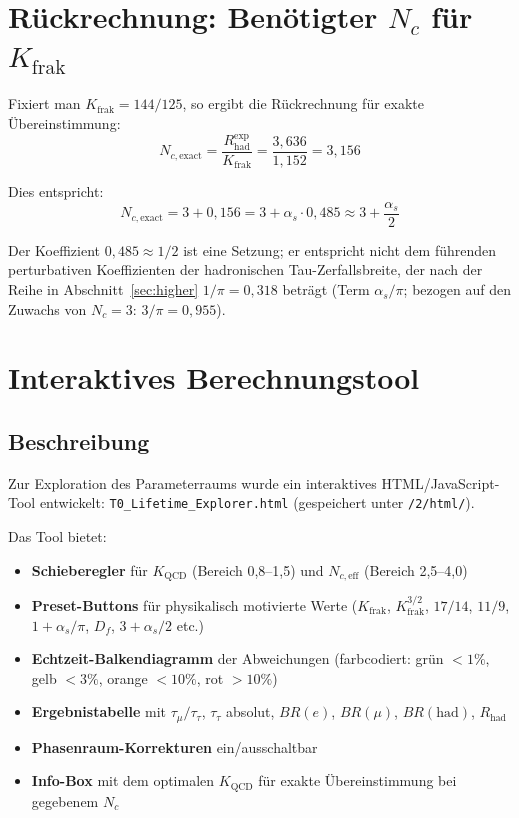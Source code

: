 	
	\section{Rückrechnung: Benötigter $N_c$ für $K_\text{frak}$}
	
	Fixiert man $K_\text{frak} = 144/125$, so ergibt die Rückrechnung für exakte Übereinstimmung:
	\begin{equation}
		N_{c,\text{exact}} = \frac{R_\text{had}^\text{exp}}{K_\text{frak}} = \frac{3{,}636}{1{,}152} = 3{,}156
	\end{equation}
	
	Dies entspricht:
	\begin{equation}
		N_{c,\text{exact}} = 3 + 0{,}156 = 3 + \alpha_s \cdot 0{,}485 \approx 3 + \frac{\alpha_s}{2}
	\end{equation}
	
	Der Koeffizient $0{,}485 \approx 1/2$ ist eine Setzung; er entspricht nicht dem führenden perturbativen Koeffizienten der hadronischen Tau-Zerfallsbreite, der nach der Reihe in Abschnitt~\ref{sec:higher} $1/\pi = 0{,}318$ beträgt (Term $\alpha_s/\pi$; bezogen auf den Zuwachs von $N_c = 3$: $3/\pi = 0{,}955$).
	
	
	\section{Interaktives Berechnungstool}
	
	\subsection{Beschreibung}
	
	Zur Exploration des Parameterraums wurde ein interaktives HTML/JavaScript-Tool entwickelt: \texttt{T0\_Lifetime\_Explorer.html} (gespeichert unter \texttt{/2/html/}).
	
	Das Tool bietet:
	\begin{itemize}
		\item \textbf{Schieberegler} für $K_\text{QCD}$ (Bereich 0,8--1,5) und $N_{c,\text{eff}}$ (Bereich 2,5--4,0)
		\item \textbf{Preset-Buttons} für physikalisch motivierte Werte ($K_\text{frak}$, $K_\text{frak}^{3/2}$, $17/14$, $11/9$, $1+\alpha_s/\pi$, $D_f$, $3+\alpha_s/2$ etc.)
		\item \textbf{Echtzeit-Balkendiagramm} der Abweichungen (farbcodiert: grün $<1\%$, gelb $<3\%$, orange $<10\%$, rot $>10\%$)
		\item \textbf{Ergebnistabelle} mit $\tau_\mu/\tau_\tau$, $\tau_\tau$ absolut, $BR(e)$, $BR(\mu)$, $BR(\text{had})$, $R_\text{had}$
		\item \textbf{Phasenraum-Korrekturen} ein/ausschaltbar
		\item \textbf{Info-Box} mit dem optimalen $K_\text{QCD}$ für exakte Übereinstimmung bei gegebenem $N_c$
	\end{itemize}
	
